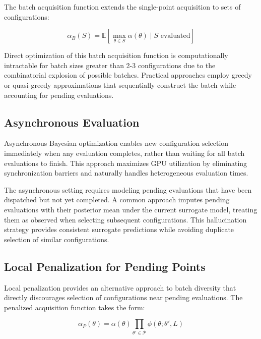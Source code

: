 The batch acquisition function extends the single-point acquisition to sets of configurations:

\begin{equation}
\alpha_B(S) = \mathbb{E}\left[ \max_{\theta \in S} \alpha(\theta) \mid S \text{ evaluated} \right]
\label{eq:batch_acquisition}
\end{equation}

Direct optimization of this batch acquisition function is computationally intractable for batch sizes greater than 2-3 configurations due to the combinatorial explosion of possible batches. Practical approaches employ greedy or quasi-greedy approximations that sequentially construct the batch while accounting for pending evaluations.

\subsection{Asynchronous Evaluation}

Asynchronous Bayesian optimization enables new configuration selection immediately when any evaluation completes, rather than waiting for all batch evaluations to finish. This approach maximizes GPU utilization by eliminating synchronization barriers and naturally handles heterogeneous evaluation times.

The asynchronous setting requires modeling pending evaluations that have been dispatched but not yet completed. A common approach imputes pending evaluations with their posterior mean under the current surrogate model, treating them as observed when selecting subsequent configurations. This hallucination strategy provides consistent surrogate predictions while avoiding duplicate selection of similar configurations.

\subsection{Local Penalization for Pending Points}

Local penalization provides an alternative approach to batch diversity that directly discourages selection of configurations near pending evaluations. The penalized acquisition function takes the form:

\begin{equation}
\alpha_P(\theta) = \alpha(\theta) \prod_{\theta' \in \mathcal{P}} \phi(\theta; \theta', L)
\label{eq:local_penalization}
\end{equation}

